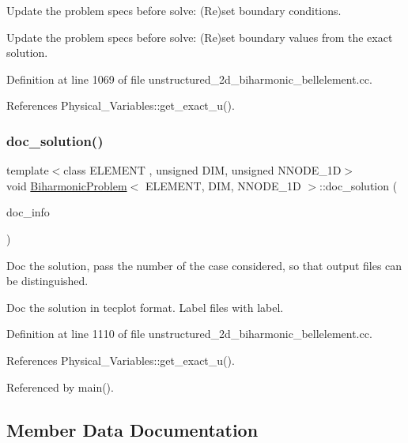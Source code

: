 Update the problem specs before solve\+: (Re)set boundary conditions. 

Update the problem specs before solve\+: (Re)set boundary values from the exact solution. 

Definition at line 1069 of file unstructured\+\_\+2d\+\_\+biharmonic\+\_\+bellelement.\+cc.



References Physical\+\_\+\+Variables\+::get\+\_\+exact\+\_\+u().

\mbox{\label{classBiharmonicProblem_a0cb56f30738170a8d2bfd1c8d1000fd4}} 
\subsubsection{\texorpdfstring{doc\+\_\+solution()}{doc\_solution()}}
{\footnotesize\ttfamily template$<$class E\+L\+E\+M\+E\+NT , unsigned D\+IM, unsigned N\+N\+O\+D\+E\+\_\+1D$>$ \\
void \hyperlink{classBiharmonicProblem}{Biharmonic\+Problem}$<$ E\+L\+E\+M\+E\+NT, D\+IM, N\+N\+O\+D\+E\+\_\+1D $>$\+::doc\+\_\+solution (\begin{DoxyParamCaption}\item[{Doc\+Info \&}]{doc\+\_\+info }\end{DoxyParamCaption})}



Doc the solution, pass the number of the case considered, so that output files can be distinguished. 

Doc the solution in tecplot format. Label files with label. 

Definition at line 1110 of file unstructured\+\_\+2d\+\_\+biharmonic\+\_\+bellelement.\+cc.



References Physical\+\_\+\+Variables\+::get\+\_\+exact\+\_\+u().



Referenced by main().



\subsection{Member Data Documentation}
\mbox{\label{classBiharmonicProblem_a4e4e3dc027b6ccf7b0b4e519f84b0843}} 

